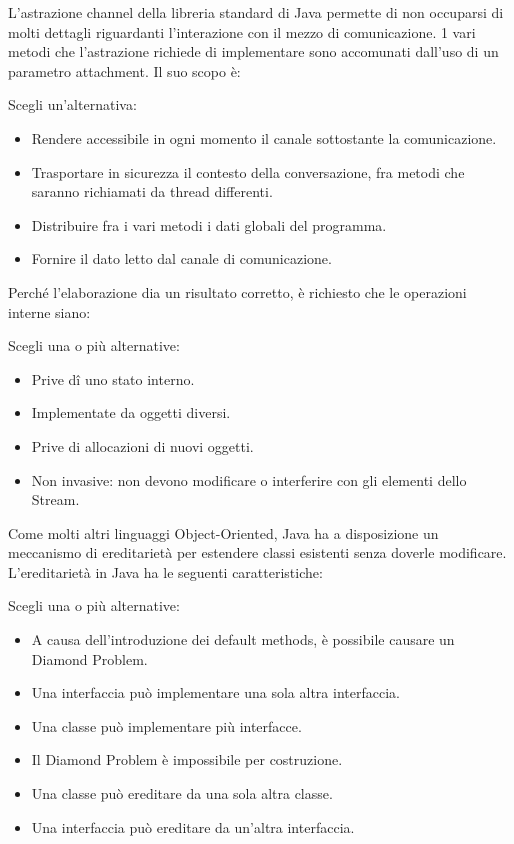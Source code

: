 \documentclass{article}
\begin{document}
L'astrazione channel della libreria standard di Java permette di non occuparsi di molti dettagli riguardanti l'interazione con il mezzo di comunicazione. 1 vari metodi che
l'astrazione richiede di implementare sono accomunati dall'uso di un parametro attachment. Il suo scopo è:

Scegli un'alternativa: 

\begin{itemize}
	\item Rendere accessibile in ogni momento il canale sottostante la comunicazione.
	\item \checkmark Trasportare in sicurezza il contesto della conversazione, fra metodi che saranno richiamati da thread differenti.
	\item Distribuire fra i vari metodi i dati globali del programma.
	\item Fornire il dato letto dal canale di comunicazione.
\end{itemize}

Perché l'elaborazione dia un risultato corretto, è richiesto che le operazioni interne siano:

Scegli una o più alternative:

\begin{itemize}
	\item Prive dî uno stato interno.
	\item Implementate da oggetti diversi.
	\item Prive di allocazioni di nuovi oggetti.
	\item \checkmark Non invasive: non devono modificare o interferire con gli elementi dello Stream.
\end{itemize}

Come molti altri linguaggi Object-Oriented, Java ha a disposizione un meccanismo di ereditarietà per estendere classi esistenti senza doverle modificare. L'ereditarietà in
Java ha le seguenti caratteristiche:

Scegli una o più alternative:

\begin{itemize}
	\item \checkmark A causa dell'introduzione dei default methods, è possibile causare un Diamond Problem.
	\item Una interfaccia può implementare una sola altra interfaccia.
	\item \checkmark Una classe può implementare più interfacce. 
	\item Il Diamond Problem è impossibile per costruzione.
	\item \checkmark Una classe può ereditare da una sola altra classe.
	\item \checkmark Una interfaccia può ereditare da un'altra interfaccia.
\end{itemize}
\end{document}
